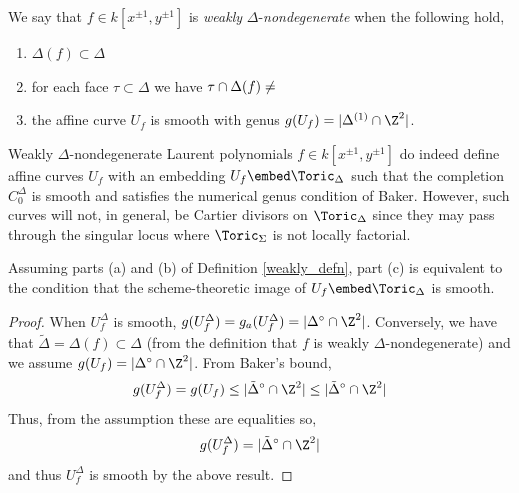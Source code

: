\begin{defn} \label{weakly_defn}
We say that $f \in k[x^{\pm 1}, y^{\pm 1}]$ is \textit{weakly} $\Delta$-\textit{nondegenerate} when the following hold,
\begin{enumerate}
\item $\Delta(f) \subset \Delta$
\item for each face $\tau \subset \Delta$ we have $\tau \cap \Delta(f) \neq \empty$
\item the affine curve $U_f$ is smooth with genus $g(U_f) = | \Delta^{(1)} \cap \Z^2 |$. 
\end{enumerate}
\end{defn}
\noindent
Weakly $\Delta$-nondegenerate Laurent polynomials $f \in k[x^{\pm 1}, y^{\pm 1}]$ do indeed define affine curves $U_f$ with an embedding $U_f \embed \Toric_\Delta$ such that the completion $C_0^\Delta$ is smooth and satisfies the numerical genus condition of Baker. However, such curves will not, in general, be Cartier divisors on $\Toric_\Delta$ since they may pass through the singular locus where $\Toric_\Sigma$ is not locally factorial. 

\begin{lemma}
Assuming parts (a) and (b) of Definition \ref{weakly_defn}, part (c) is equivalent to the condition that the scheme-theoretic image of $U_f \embed \Toric_\Delta$ is smooth. 
\end{lemma}

\begin{proof}
When $U_f^\Delta$ is smooth, $g(U_f^\Delta) = g_a(U_f^\Delta) = | \Delta^\circ \cap \Z^2|$. Conversely, we have that $\tilde{\Delta} = \Delta(f) \subset \Delta$ (from the definition that $f$ is weakly $\Delta$-nondegenerate) and we assume $g(U_f) = | \Delta^\circ \cap \Z^2 |$. From Baker's bound,
\[ g(U_f^\Delta) = g(U_f) \le |\tilde{\Delta}^\circ \cap \Z^2| \le |\tilde{\Delta}^\circ \cap \Z^2 | \] 
Thus, from the assumption these are equalities so,
\[ g(U_f^\Delta) = | \tilde{\Delta}^\circ \cap \Z^2 | \]
and thus $U_f^\Delta$ is smooth by the above result.
\end{proof}

